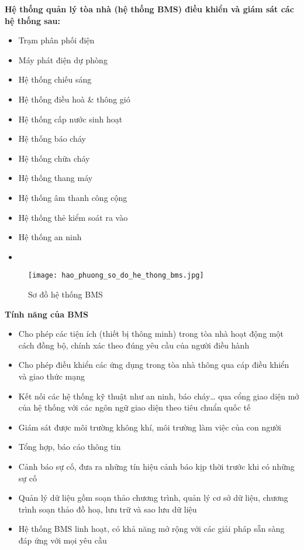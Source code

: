 	\textbf{Hệ thống quản lý tòa nhà (hệ thống BMS) điều khiển và giám sát các hệ thống sau:}
\begin{multicols}{2}
	\begin{itemize}
		\item Trạm phân phối điện
		\item Máy phát điện dự phòng
		\item Hệ thống chiếu sáng
		\item Hệ thống điều hoà \& thông gió
		\item Hệ thống cấp nước sinh hoạt
		\item Hệ thống báo cháy
		\item Hệ thống chữa cháy
		\item Hệ thống thang máy
		\item Hệ thống âm thanh công cộng
		\item Hệ thống thẻ kiểm soát ra vào
		\item Hệ thống an ninh
		\item[\vspace{\fill}] %
	\end{itemize}
\end{multicols}
	
	\begin{figure}[H]
		\centering
		\texttt{[image: hao\_phuong\_so\_do\_he\_thong\_bms.jpg]}	
		\caption{Sơ đồ hệ thống BMS}
	\end{figure}

	\textbf{Tính năng của BMS}
\begin{itemize}[leftmargin=2cm]
	\item Cho phép các tiện ích (thiết bị thông minh) trong tòa nhà hoạt động một cách đồng bộ, chính xác theo đúng yêu cầu của người điều hành
	
	\item Cho phép điều khiển các ứng dụng trong tòa nhà thông qua cáp điều khiển và giao thức mạng
	
	\item Kết nối các hệ thống kỹ thuật như an ninh, báo cháy… qua cổng giao diện mở của hệ thống với các ngôn ngữ giao diện theo tiêu chuẩn quốc tế
	
	\item Giám sát được môi trường không khí, môi trường làm việc của con người
	
	\item Tổng hợp, báo cáo thông tin
	
	\item Cảnh báo sự cố, đưa ra những tín hiệu cảnh báo kịp thời trước khi có những sự cố
	
	\item Quản lý dữ liệu gồm soạn thảo chương trình, quản lý cơ sở dữ liệu, chương trình soạn thảo đồ hoạ, lưu trữ và sao lưu dữ liệu
	
	\item Hệ thống BMS linh hoạt, có khả năng mở rộng với các giải pháp sẵn sàng đáp ứng với mọi yêu cầu
\end{itemize}

